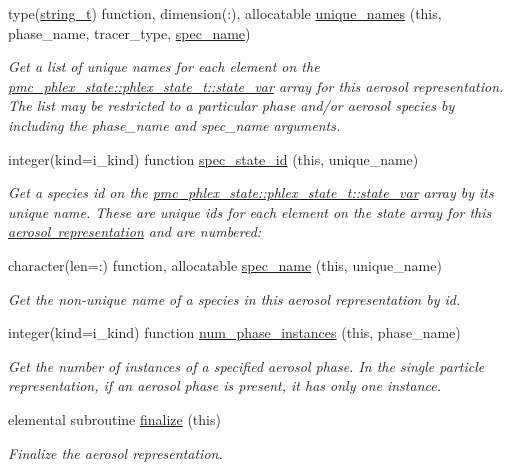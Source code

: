 \begin{DoxyCompactItemize}
type(\mbox{\hyperlink{structpmc__util_1_1string__t}{string\+\_\+t}}) function, dimension(\+:), allocatable \mbox{\hyperlink{namespacepmc__aero__rep__single__particle_a1098b3373c2ff364ed4ff94ae7c92e87}{unique\+\_\+names}} (this, phase\+\_\+name, tracer\+\_\+type, \mbox{\hyperlink{interfacepmc__aero__rep__data_1_1spec__name}{spec\+\_\+name}})
\begin{DoxyCompactList}\small\item\em Get a list of unique names for each element on the {\ttfamily \mbox{\hyperlink{structpmc__phlex__state_1_1phlex__state__t_a78835cb552d483ebbfc7a6bc6f756918}{pmc\+\_\+phlex\+\_\+state\+::phlex\+\_\+state\+\_\+t\+::state\+\_\+var}}} array for this aerosol representation. The list may be restricted to a particular phase and/or aerosol species by including the phase\+\_\+name and spec\+\_\+name arguments. \end{DoxyCompactList}\item 
integer(kind=i\+\_\+kind) function \mbox{\hyperlink{namespacepmc__aero__rep__single__particle_a7621cb78dd3cc167e9e4ff7ab3be7333}{spec\+\_\+state\+\_\+id}} (this, unique\+\_\+name)
\begin{DoxyCompactList}\small\item\em Get a species id on the {\ttfamily \mbox{\hyperlink{structpmc__phlex__state_1_1phlex__state__t_a78835cb552d483ebbfc7a6bc6f756918}{pmc\+\_\+phlex\+\_\+state\+::phlex\+\_\+state\+\_\+t\+::state\+\_\+var}}} array by its unique name. These are unique ids for each element on the state array for this \mbox{\hyperlink{phlex_aero_rep}{aerosol representation}} and are numbered\+: \end{DoxyCompactList}\item 
character(len=\+:) function, allocatable \mbox{\hyperlink{namespacepmc__aero__rep__single__particle_aca095bc0566cf66509faf0681db0ecf1}{spec\+\_\+name}} (this, unique\+\_\+name)
\begin{DoxyCompactList}\small\item\em Get the non-\/unique name of a species in this aerosol representation by id. \end{DoxyCompactList}\item 
integer(kind=i\+\_\+kind) function \mbox{\hyperlink{namespacepmc__aero__rep__single__particle_abc4795895a678ddfb6bd453ec35e92ae}{num\+\_\+phase\+\_\+instances}} (this, phase\+\_\+name)
\begin{DoxyCompactList}\small\item\em Get the number of instances of a specified aerosol phase. In the single particle representation, if an aerosol phase is present, it has only one instance. \end{DoxyCompactList}\item 
elemental subroutine \mbox{\hyperlink{namespacepmc__aero__rep__single__particle_aa3414449aefecf962c845663fbd25826}{finalize}} (this)
\begin{DoxyCompactList}\small\item\em Finalize the aerosol representation. \end{DoxyCompactList}\end{DoxyCompactItemize}
